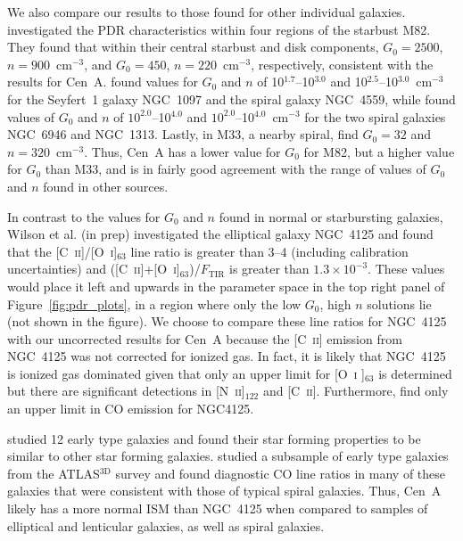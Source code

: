 \documentclass[preprint2]{aastex}
\begin{document}
We also compare our results to those found for other individual galaxies.  \citet{2013A&A...549A.118C} investigated the PDR characteristics within four regions of the starbust M82.  They found that within their central starbust and disk components, $G_{0} = 2500$, $n = 900$~cm$^{-3}$, and $G_{0} = 450$, $n = 220$~cm$^{-3}$, respectively, consistent with the results for Cen~A.  \citet{2012ApJ...747...81C} found values for $G_{0}$ and $n$ of 10$^{1.7}$--10$^{3.0}$ and 10$^{2.5}$--10$^{3.0}$~cm$^{-3}$ for the Seyfert~1 galaxy NGC~1097 and the spiral galaxy NGC~4559, while \citet{2002AJ....124..751C} found values of $G_{0}$ and $n$ of $10^{2.0}$--10$^{4.0}$  and $10^{2.0}$--10$^{4.0}$~cm$^{-3}$ for the two spiral galaxies NGC~6946 and NGC~1313.  Lastly, in M33, a nearby spiral, \citet{2011A&A...532A.152M} find $G_{0} = 32$ and $n = 320$~cm$^{-3}$.  Thus, Cen~A has a lower value for $G_{0}$ for M82, but a higher value for $G_{0}$ than M33, and is in fairly good agreement with the range of values of $G_{0}$ and $n$ found in other sources.

In contrast to the values for $G_{0}$ and $n$ found in normal or starbursting galaxies, Wilson et al. (in prep) investigated the elliptical galaxy NGC~4125 and found that the [C~\textsc{ii}]/[O~\textsc{i}]$_{63}$ line ratio is greater than 3--4 (including calibration uncertainties) and ([C~\textsc{ii}]+[O~\textsc{i}]$_{63}$)/$F_{\mathrm{TIR}}$ is greater than $1.3 \times 10^{-3}$.  These values would place it left and upwards in the parameter space in the top right panel of Figure~\ref{fig:pdr_plots}, in a region where only the low $G_{0}$, high $n$ solutions lie (not shown in the figure).  We choose to compare these line ratios for NGC~4125 with our uncorrected results for Cen~A because the [C~\textsc{ii}] emission from NGC~4125 was not corrected for ionized gas.  In fact, it is likely that NGC~4125 is ionized gas dominated given that only an upper limit for [O~\textsc{i} ]$_{63}$ is determined but there are significant detections in [N~\textsc{ii}]$_{122}$ and [C~\textsc{ii}].  Furthermore, \citet{2010ApJ...725..100W} find only an upper limit in CO emission for NGC4125.

\citet{2011MNRAS.410.1197C} studied 12 early type galaxies and found their star forming properties to be similar to other star forming galaxies.  \citet{2012MNRAS.421.1298C} studied a subsample of early type galaxies from the ATLAS$^{3\mathrm{D}}$ survey \citep{2011MNRAS.414..940Y} and found diagnostic CO line ratios in many of these galaxies that were consistent with those of typical spiral galaxies.   Thus, Cen~A likely has a more normal ISM than NGC~4125 when compared to samples of elliptical and lenticular galaxies, as well as spiral galaxies.  
\end{document}
